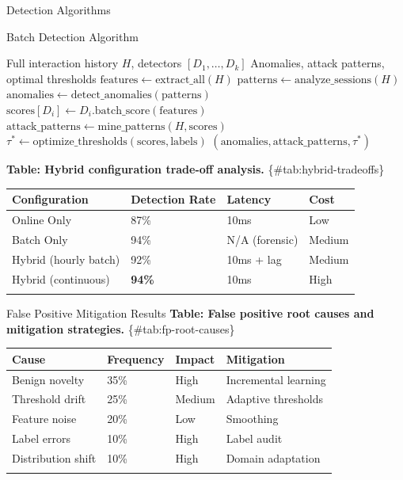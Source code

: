 \documentclass[
  ignorenonframetext,
]{beamer}
\newcounter{none} %
\begin{document}
\begin{frame}{Detection Algorithms}
\begin{block}{Batch Detection Algorithm}
\protect{}\label{batch-detection-algorithm}
\begin{algorithm}
\caption{Batch Detection Analysis}
\label{alg:batch-detection}
\begin{algorithmic}[1]
\Require Full interaction history $H$, detectors $[D_1, \ldots, D_k]$
\Ensure Anomalies, attack patterns, optimal thresholds
\State $\text{features} \gets \text{extract\_all}(H)$
\State $\text{patterns} \gets \text{analyze\_sessions}(H)$
\State $\text{anomalies} \gets \text{detect\_anomalies}(\text{patterns})$
    \State $\text{scores}[D_i] \gets D_i.\text{batch\_score}(\text{features})$
\EndFor
\State $\text{attack\_patterns} \gets \text{mine\_patterns}(H, \text{scores})$
\State $\tau^* \gets \text{optimize\_thresholds}(\text{scores}, \text{labels})$
\State \Return $(\text{anomalies}, \text{attack\_patterns}, \tau^*)$
\end{algorithmic}
\end{algorithm}

\textbf{Table: Hybrid configuration trade-off analysis.}
\{\#tab:hybrid-tradeoffs\}

{\def\LTcaptype{none} %
\begin{longtable}[]{@{}llll@{}}
\toprule\noalign{}
Configuration & Detection Rate & Latency & Cost \\
\midrule\noalign{}
\endhead
Online Only & 87\% & 10ms & Low \\
Batch Only & 94\% & N/A (forensic) & Medium \\
Hybrid (hourly batch) & 92\% & 10ms + lag & Medium \\
Hybrid (continuous) & \textbf{94\%} & 10ms & High \\
\bottomrule\noalign{}
\end{longtable}
}
\end{block}

\begin{block}{False Positive Mitigation Results}
\protect{}\label{false-positive-mitigation-results}
\textbf{Table: False positive root causes and mitigation strategies.}
\{\#tab:fp-root-causes\}

{\def\LTcaptype{none} %
\begin{longtable}[]{@{}llll@{}}
\toprule\noalign{}
Cause & Frequency & Impact & Mitigation \\
\midrule\noalign{}
\endhead
Benign novelty & 35\% & High & Incremental learning \\
Threshold drift & 25\% & Medium & Adaptive thresholds \\
Feature noise & 20\% & Low & Smoothing \\
Label errors & 10\% & High & Label audit \\
Distribution shift & 10\% & High & Domain adaptation \\
\bottomrule\noalign{}
\end{longtable}
}
\end{block}


\end{frame}
\end{document}
